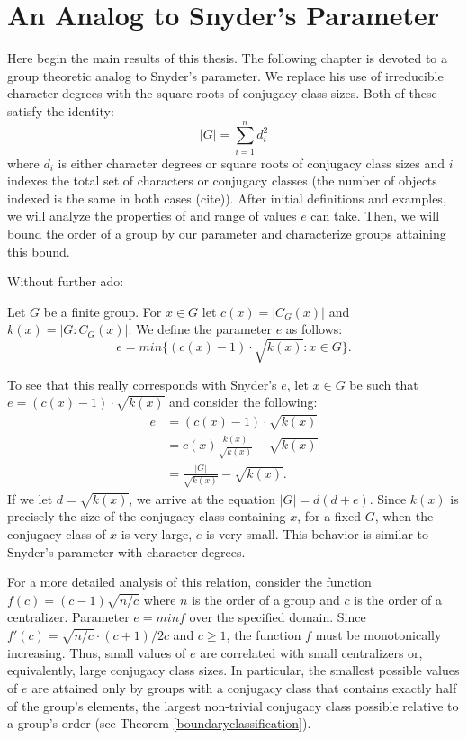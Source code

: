 \documentclass[main.tex]{subfiles}
\begin{document}
\chapter{An Analog to Snyder's Parameter}

Here begin the main results of this thesis. The following chapter is devoted to a group theoretic analog to Snyder's parameter. We replace his use of irreducible character degrees with the square roots of conjugacy class sizes. Both of these satisfy the identity:
$$|G| = \sum_{i=1}^n d_i^2$$
where $d_i$ is either character degrees or square roots of conjugacy class sizes and $i$ indexes the total set of characters or conjugacy classes (the number of objects indexed is the same in both cases (cite)). After initial definitions and examples, we will analyze the properties of and range of values $e$ can take. Then, we will bound the order of a group by our parameter and characterize groups attaining this bound.

Without further ado:

\hss

\begin{definition}
Let $G$ be a finite group. For $x \in G$ let $c(x) = |C_G(x)|$ and $k(x) = |G : C_G(x)|$. We define the parameter $e$ as follows:
$$e = min\{(c(x) - 1) \cdot \sqrt{k(x)} : x \in G\}\text{.}$$
\end{definition}

\hss

To  see that this really corresponds with Snyder's $e$, let $x \in G$ be such that $e = (c(x) - 1) \cdot \sqrt{k(x)}$ and consider the following:
\begin{align*}
e &= (c(x) - 1) \cdot \sqrt{k(x)} \\
 &= c(x)\frac{k(x)}{\sqrt{k(x)}} - \sqrt{k(x)} \\
 &= \frac{|G|}{\sqrt{k(x)}} - \sqrt{k(x)}\text{.}
\end{align*}
If we let $d = \sqrt{k(x)}$, we arrive at the equation $|G| = d (d + e)$. Since $k(x)$ is precisely the size of the conjugacy class containing $x$, for a fixed $G$, when the conjugacy class of $x$ is very large, $e$ is very small. This behavior is similar to Snyder's parameter with character degrees. 

For a more detailed analysis of this relation, consider the function $f(c) = (c - 1) \sqrt{n/c}$ where $n$ is the order of a group and $c$ is the order of a centralizer. Parameter $e = min f$ over the specified domain. Since $f'(c) = \sqrt{n/c} \cdot (c+1) / 2c$ and $c \ge 1$, the function $f$ must be monotonically increasing. Thus, small values of $e$ are correlated with small centralizers or, equivalently, large conjugacy class sizes. In particular, the smallest possible values of $e$ are attained only by groups with a conjugacy class that contains exactly half of the group's elements, the largest non-trivial conjugacy class possible relative to a group's order (see Theorem \ref{boundaryclassification}).
\end{document}

